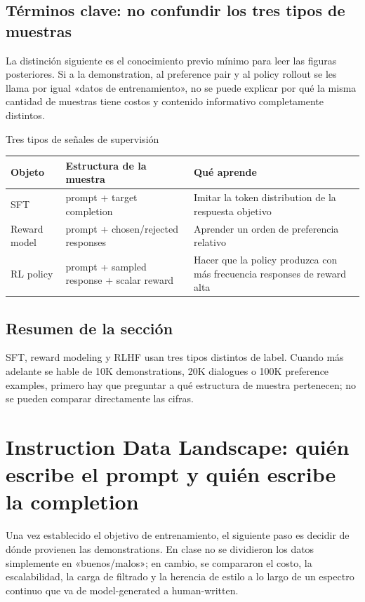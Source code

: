 \documentclass[a4paper]{article}
\begin{document}
\subsection{Términos clave: no confundir los tres tipos de muestras}

La distinción siguiente es el conocimiento previo mínimo para leer las figuras posteriores. Si a la demonstration, al preference pair y al policy rollout se les llama por igual «datos de entrenamiento», no se puede explicar por qué la misma cantidad de muestras tiene costos y contenido informativo completamente distintos.

\begin{knowledgebox}{Tres tipos de señales de supervisión}
\begin{tabularx}{\textwidth}{@{}L{0.18\textwidth}L{0.25\textwidth}X@{}}
\toprule
Objeto & Estructura de la muestra & Qué aprende \\
\midrule
SFT & prompt + target completion & Imitar la token distribution de la respuesta objetivo \\
Reward model & prompt + chosen/rejected responses & Aprender un orden de preferencia relativo \\
RL policy & prompt + sampled response + scalar reward & Hacer que la policy produzca con más frecuencia responses de reward alta \\
\bottomrule
\end{tabularx}
\end{knowledgebox}

\subsection{Resumen de la sección}

SFT, reward modeling y RLHF usan tres tipos distintos de label. Cuando más adelante se hable de 10K demonstrations, 20K dialogues o 100K preference examples, primero hay que preguntar a qué estructura de muestra pertenecen; no se pueden comparar directamente las cifras.
\section{Instruction Data Landscape: quién escribe el prompt y quién escribe la completion}

Una vez establecido el objetivo de entrenamiento, el siguiente paso es decidir de dónde provienen las demonstrations. En clase no se dividieron los datos simplemente en «buenos/malos»; en cambio, se compararon el costo, la escalabilidad, la carga de filtrado y la herencia de estilo a lo largo de un espectro continuo que va de model-generated a human-written.
\end{document}
